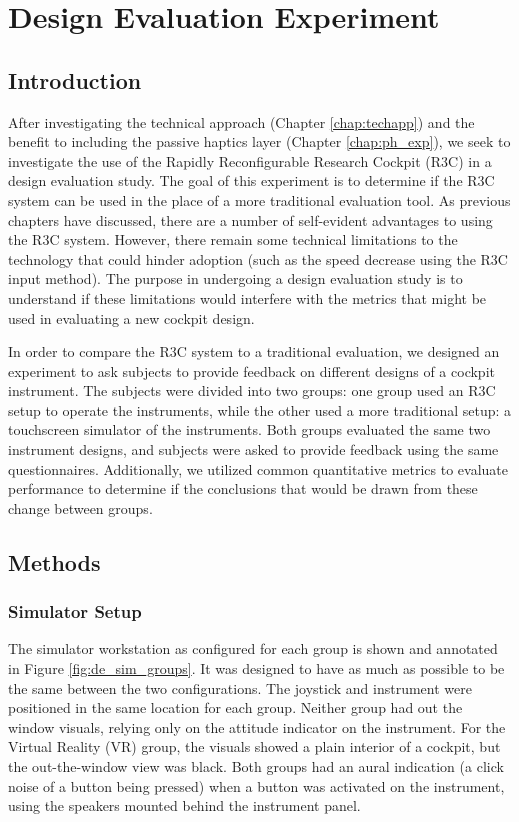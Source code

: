 \chapter{Design Evaluation Experiment}
\label{chap:de_exp}

\section{Introduction}

After investigating the technical approach (Chapter \autoref{chap:techapp}) and the benefit to including the passive haptics layer (Chapter \autoref{chap:ph_exp}), we seek to investigate the use of the Rapidly Reconfigurable Research Cockpit (R3C) in a design evaluation study.
The goal of this experiment is to determine if the R3C system can be used in the place of a more traditional evaluation tool.
As previous chapters have discussed, there are a number of self-evident advantages to using the R3C system.
However, there remain some technical limitations to the technology that could hinder adoption (such as the speed decrease using the R3C input method).
The purpose in undergoing a design evaluation study is to understand if these limitations would interfere with the metrics that might be used in evaluating a new cockpit design.

In order to compare the R3C system to a traditional evaluation, we designed an experiment to ask subjects to provide feedback on different designs of a cockpit instrument.
The subjects were divided into two groups: one group used an R3C setup to operate the instruments, while the other used a more traditional setup: a touchscreen simulator of the instruments.
Both groups evaluated the same two instrument designs, and subjects were asked to provide feedback using the same questionnaires.
Additionally, we utilized common quantitative metrics to evaluate performance to determine if the conclusions that would be drawn from these change between groups.

\section{Methods}

\subsection{Simulator Setup}

The simulator workstation as configured for each group is shown and annotated in Figure \ref{fig:de_sim_groups}.
It was designed to have as much as possible to be the same between the two configurations.
The joystick and instrument were positioned in the same location for each group.
Neither group had out the window visuals, relying only on the attitude indicator on the instrument.
For the Virtual Reality (VR) group, the visuals showed a plain interior of a cockpit, but the out-the-window view was black.
Both groups had an aural indication (a click noise of a button being pressed) when a button was activated on the instrument, using the speakers mounted behind the instrument panel.

